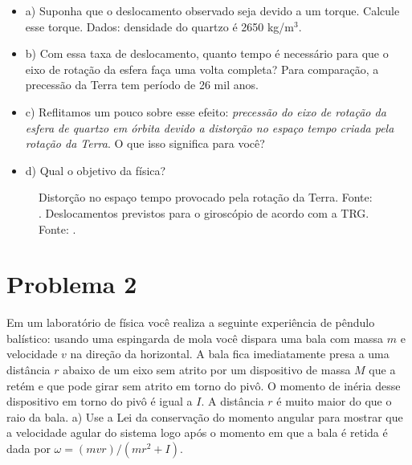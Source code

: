 \documentclass[a4paper, 11pt]{article}
\begin{document}
\begin{itemize}
\item a) Suponha que o deslocamento observado seja devido a um torque. Calcule esse torque. Dados: densidade do quartzo é 2650 kg/m$^3$.
\item b) Com essa taxa de deslocamento, quanto tempo é necessário para que o eixo de rotação da esfera faça uma volta completa? Para comparação, a precessão da Terra tem período de 26 mil anos.
\item c) Reflitamos um pouco sobre esse efeito: \textit{precessão do eixo de rotação da esfera de quartzo em órbita devido a distorção no espaço tempo criada pela rotação da Terra}. O que isso significa para você?
\item d) Qual o objetivo da física?
\end{itemize}

\begin{figure}
\centering
{}
\caption{ Distorção no espaço tempo provocado pela rotação da Terra. Fonte: \cite{site}.  Deslocamentos previstos para o giroscópio de acordo com a TRG. Fonte: \cite{Everitt}.}
\end{figure}


\section*{Problema 2}
Em um laboratório de física você realiza a seguinte experiência de pêndulo balístico: usando uma espingarda de mola você dispara uma bala com massa $m$ e velocidade $v$ na direção da horizontal. A bala fica imediatamente presa a uma distância $r$ abaixo de um eixo sem atrito por um dispositivo de massa $M$ que a retém e que pode girar sem atrito em torno do pivô. O momento de inéria desse dispositivo em torno do pivô é igual a $I$. A distância $r$ é muito maior do que o raio da bala. a) Use a Lei da conservação do momento angular para mostrar que a velocidade agular do sistema logo após o momento em que a bala é retida é dada por $\omega = (mvr)/(mr^2 +I)$. 
\end{document}
